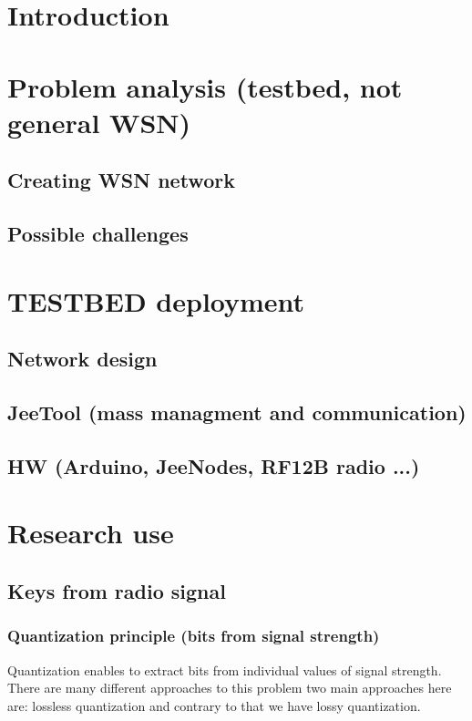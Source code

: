 \documentclass[
  digital, %
  table,   %
  nolof,     %
  nolot,     %
           oneside
]{fithesis3}
\begin{document}

\chapter{Introduction}
\chapter{ Problem analysis (testbed, not general WSN)}
  \section{Creating WSN network}
  \section{Possible challenges}
\chapter{TESTBED deployment}
  \section{Network design}
  \section{JeeTool (mass managment and communication)}
  \section{HW (Arduino, JeeNodes, RF12B radio ...)}\label{sec:hw}
\chapter{Research use}
  \section{Keys from radio signal}
    \subsection{Quantization principle (bits from signal strength)}
    Quantization enables to extract bits from individual values of signal strength. There are many different approaches to this problem %
    two main approaches here are: lossless quantization %
    and contrary to that we have lossy quantization.
\end{document}
